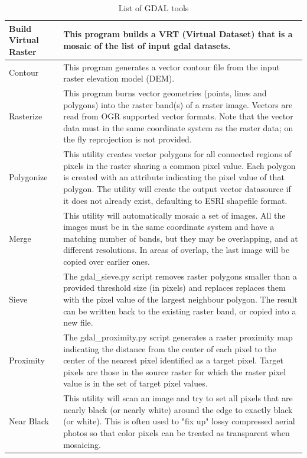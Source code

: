 {\setlength{\extrarowheight}{15pt}
\begin{longtable}{|p{3cm}|p{13cm}|}
\caption{List of GDAL tools}\label{tab:gdaltools} \\
\hline
Build Virtual Raster & This program builds a VRT (Virtual Dataset) that is a mosaic of the list of input gdal datasets. \\
\hline Contour & This program generates a vector contour file from the input raster elevation model (DEM).\\
\hline Rasterize &  This program burns vector geometries (points, lines and polygons) into the raster band(s) of a raster image. Vectors are read from OGR supported vector formats. Note that the vector data must in the same coordinate system as the raster data; on the fly reprojection is not provided.\\
\hline Polygonize & This utility creates vector polygons for all connected regions of pixels in the raster sharing a common pixel value. Each polygon is created with an attribute indicating the pixel value of that polygon.
The utility will create the output vector datasource if it does not already exist, defaulting to ESRI shapefile format.\\
\hline Merge &  This utility will automatically mosaic a set of images. All the images must be in the same coordinate system and have a matching number of bands, but they may be overlapping, and at different resolutions. In areas of overlap, the last image will be copied over earlier ones. \\
\hline Sieve & The gdal\_sieve.py script removes raster polygons smaller than a provided threshold size (in pixels) and replaces replaces them with the pixel value of the largest neighbour polygon. The result can be written back to the existing raster band, or copied into a new file.\\
\hline Proximity & The gdal\_proximity.py script generates a raster proximity map indicating the distance from the center of each pixel to the center of the nearest pixel identified as a target pixel. Target pixels are those in the source raster for which the raster pixel value is in the set of target pixel values.\\
\hline Near Black & This utility will scan an image and try to set all pixels that are nearly black (or nearly white) around the edge to exactly black (or white). This is often used to "fix up" lossy compressed aerial photos so that color pixels can be treated as transparent when mosaicing.\\

\end{longtable}}
